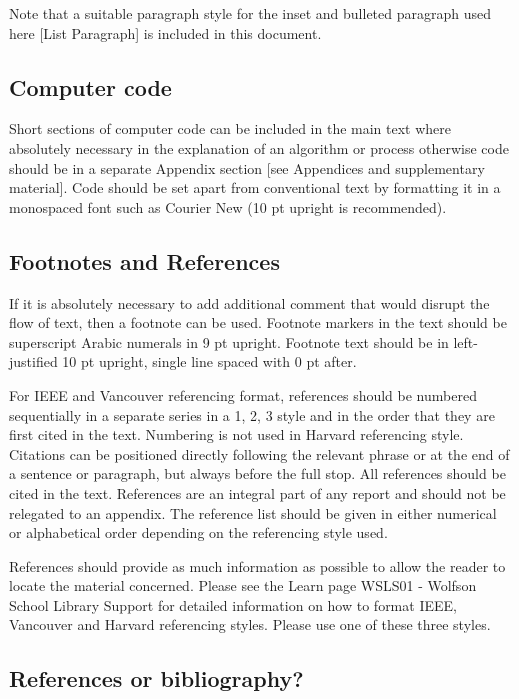 \documentclass[12pt]{article}
\begin{document}
Note that a suitable paragraph style for the inset and bulleted
paragraph used here {[}List Paragraph{]} is included in this document.

\hypertarget{computer-code}{%
\subsection{Computer code}\label{computer-code}}

Short sections of computer code can be included in the main text where
absolutely necessary in the explanation of an algorithm or process
otherwise code should be in a separate Appendix section {[}see
Appendices and supplementary material{]}. Code should be set apart from
conventional text by formatting it in a monospaced font such as Courier
New (10 pt upright is recommended).

\hypertarget{footnotes-and-references}{%
\subsection{Footnotes and References}\label{footnotes-and-references}}

If it is absolutely necessary to add additional comment that would
disrupt the flow of text, then a footnote can be used. Footnote markers
in the text should be superscript Arabic numerals in 9 pt upright.
Footnote text should be in left-justified 10 pt upright, single line
spaced with 0 pt after.

For IEEE and Vancouver referencing format, references should be numbered
sequentially in a separate series in a 1, 2, 3 style and in the order
that they are first cited in the text. Numbering is not used in Harvard
referencing style. Citations can be positioned directly following the
relevant phrase or at the end of a sentence or paragraph, but always
before the full stop. All references should be cited in the text.
References are an integral part of any report and should not be
relegated to an appendix. The reference list should be given in either
numerical or alphabetical order depending on the referencing style used.

References should provide as much information as possible to allow the
reader to locate the material concerned. Please see the Learn page
WSLS01 - Wolfson School Library Support for detailed information on how
to format IEEE, Vancouver and Harvard referencing styles. Please use one
of these three styles.

\hypertarget{references-or-bibliography}{%
\subsection{References or
bibliography?}\label{references-or-bibliography}}
\end{document}

